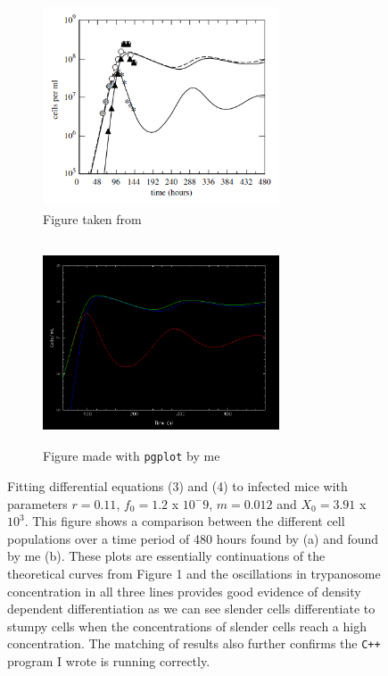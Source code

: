 \documentclass[11pt]{article}
\begin{document}
	\begin{figure}[!htb]
		\centering
		\begin{subfigure}{.5\textwidth}
			\centering
			\includegraphics[width=7cm, height=6cm]{plot3.png}
			\caption{Figure taken from \citep{tyler2001limitation}}
			\label{fig:sub1}
		\end{subfigure}%
		\begin{subfigure}{.5\textwidth}
			\centering
			\includegraphics[width=7cm, height=6cm]{plot4.png}
			\caption{Figure made with \texttt{pgplot} by me}
			\label{fig:sub2}
		\end{subfigure}
		\caption{Fitting differential equations (3) and (4) to infected mice with parameters $r = 0.11$, $f_0 = 1.2$ x $10^-9$, $m = 0.012$ and $X_0 = 3.91$ x $10^3$. This figure shows a comparison between the different cell populations over a time period of 480 hours found by \citep{tyler2001limitation} (a) and found by me (b). These plots are essentially continuations of the theoretical curves from Figure 1 and the oscillations in trypanosome concentration in all three lines provides good evidence of density dependent differentiation as we can see slender cells differentiate to stumpy cells when the concentrations of slender cells reach a high concentration. The matching of results also further confirms the \texttt{C++} program I wrote is running correctly.}
		\label{fig:test}
	\end{figure}
	
\end{document}

